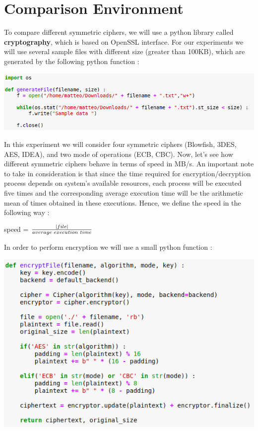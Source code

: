 \documentclass[11pt]{article}
\begin{document}
\section{Comparison Environment}
To compare different symmetric ciphers, we will use a python library called \textbf{cryptography}, which is based on OpenSSL interface. For our experiments we will use several sample files with different size (greater than 100KB), which are generated by the following python function :
\begin{center}
\includegraphics[scale=0.4]{./file_factory.png}
\end{center}
In this experiment we will consider four symmetric ciphers (Blowfish, 3DES, AES, IDEA), and two mode of operations (ECB, CBC). Now, let's see how different symmetric ciphers behave in terms of speed in MB/s. An important note to take in consideration is that since the time required for encryption/decryption process depends on system's available resources, each process will be executed five times and the corresponding average execution time will be the arithmetic mean of times obtained in these executions. Hence, we define the speed in the following way :
\begin{center}
speed = $\frac{|file|}{average\hspace{0.1cm}execution\hspace{0.1cm}time}$ 
\end{center}
In order to perform encryption we will use a small python function :
\begin{center}
\includegraphics[scale=0.5]{./encryption_function.png}
\end{center}
\end{document}
